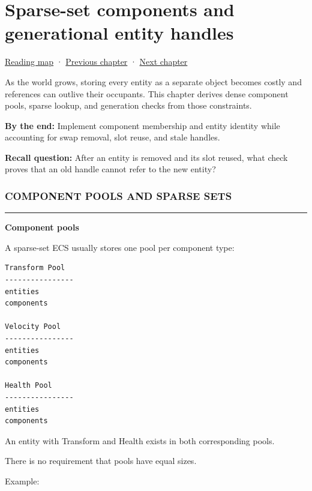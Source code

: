 \hypertarget{05-engine-i-ch015}{}
\chapter{Sparse-set components and generational entity handles}\label{stagechapter:05-engine-i-ch015}\label{05-engine-i-ch015-sparse-set-components-and-generational-entity-handles}

\hyperref[volume-reading-map]{Reading map} · \hyperref[05-engine-i-ch014-application-clocks-and-stable-input-identity]{Previous chapter} · \hyperref[05-engine-i-ch016-archetypes-chunks-relationships-and-transforms]{Next chapter}

As the world grows, storing every entity as a separate object becomes costly and references can outlive their occupants. This chapter derives dense component pools, sparse lookup, and generation checks from those constraints.

\textbf{By the end:} Implement component membership and entity identity while accounting for swap removal, slot reuse, and stale handles.

\textbf{Recall question:} After an entity is removed and its slot reused, what check proves that an old handle cannot refer to the new entity?

\subsection{COMPONENT POOLS AND SPARSE SETS}\label{05-engine-i-ch015-component-pools-and-sparse-sets}

\begin{center}\rule{0.5\linewidth}{0.5pt}\end{center}

\textbf{Component pools}

A sparse-set ECS usually stores one pool per component type:

\begin{verbatim}
Transform Pool
----------------
entities
components

Velocity Pool
----------------
entities
components

Health Pool
----------------
entities
components
\end{verbatim}

An entity with Transform and Health exists in both corresponding pools.

There is no requirement that pools have equal sizes.

Example:

